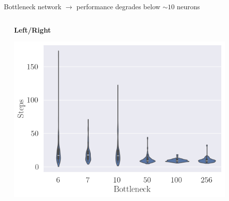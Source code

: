 \documentclass[bigger]{beamer}
\begin{document}
\begin{frame}[label={sec:orgd11d452}]{Bottleneck network \(\to\) performance degrades below \(\sim\!10\) neurons}
\begin{columns}
\begin{column}[c]{0.5\columnwidth}
\begin{center}
\end{center}
\end{column}
\begin{column}[c]{0.5\columnwidth}
\begin{center}
\small
\textbf{Left/Right}\\
\end{center}
\begin{center}
\includegraphics[width=0.9\textwidth]{medias/steps-boxplot-LeftRight.png}
\end{center}
\end{column}
\end{columns}
\end{frame}
\end{document}
